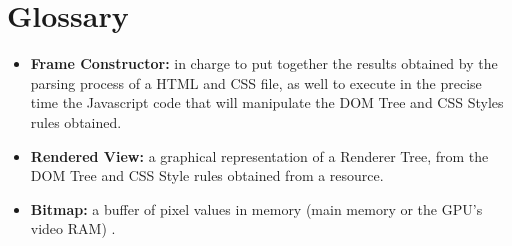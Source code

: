 \documentclass[prodmode,acmtecs]{acmsmall}
\begin{document}
\section{Glossary}
\begin{itemize}\leftskip0.2em
  \item \textbf{Frame Constructor:} in charge to put together the results obtained by the parsing process of a HTML and CSS file, as well to execute in the precise time the Javascript code that will manipulate the DOM Tree and CSS Styles rules obtained. 
  \item \textbf{Rendered View:} a graphical representation of a Renderer Tree, from the DOM Tree and CSS Style rules obtained from a resource.
  \item \textbf{Bitmap:} a buffer of pixel values in memory (main memory or the GPU’s video RAM) \cite{gpuchrome}.
\end{itemize}


  

\end{document}
